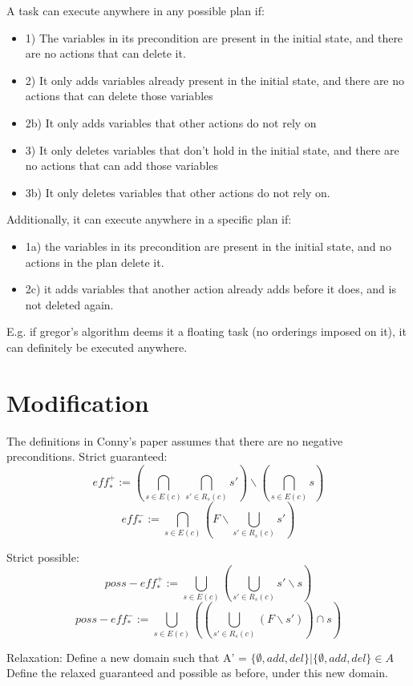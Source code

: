 A task can execute anywhere in any possible plan if: 
\begin{itemize}
\item 1) The variables in its precondition are present in the initial state, and there are no actions that can delete it.
\item 2) It only adds variables already present in the initial state, and there are no actions that can delete those variables
\item 2b) It only adds variables that other actions do not rely on
\item 3) It only deletes variables that don't hold in the initial state, and there are no actions that can add those variables
\item 3b) It only deletes variables that other actions do not rely on.
\end{itemize}


Additionally, it can execute anywhere in a specific plan if:
\begin{itemize}
\item 1a) the variables in its precondition are present in the initial state, and no actions in the plan delete it.
\item 2c) it adds variables that another action already adds before it does, and is not deleted again.
\end{itemize} 

E.g. if gregor's algorithm deems it a floating task (no orderings imposed on it),
it can definitely be executed anywhere.




\section{Modification}
The definitions in Conny's paper assumes that there are no negative preconditions.
Strict guaranteed:
 $$ eff^{+}_{*} := (\bigcap_{s \in E(c)} \bigcap_{s' \in R_s(c)} s')  \backslash  (\bigcap_{s \in E(c)} s)  $$
 $$ eff^{-}_{*} := \bigcap_{s \in E(c)} (F \backslash \bigcup_{s' \in R_s(c)}  s') $$
 
Strict possible:
 $$ poss-eff^{+}_{*} := \bigcup_{s \in E(c)} (\bigcup_{s' \in R_s(c)} s'\backslash s)   $$
 $$ poss-eff^{-}_{*} := \bigcup_{s \in E(c)} ((\bigcup_{s' \in R_s(c)} ( F \backslash s'))  \cap  s) $$


Relaxation: Define a new domain such that A' = ${ \{\emptyset, add, del \} |  \{\emptyset, add, del \} \in A }$
Define the relaxed guaranteed and possible as before, under this new domain.

